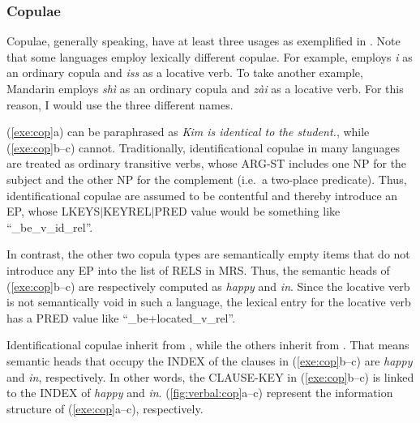 \subsubsection{Copulae}
\label{10:sssec:cop}

Copulae, generally speaking, have at least three usages as exemplified
in . Note that some languages employ
lexically different copulae. For example,  employs
\textit{i} as an ordinary copula and \textit{iss} as a locative
verb. To take another example, Mandarin  employs
\textit{sh\`{i}} as an ordinary copula and \textit{z\`{a}i} as a
locative verb. For this reason, I would use the three different names.



\noindent (\ref{exe:cop}a) can be paraphrased as \textit{Kim is
  identical to the student.}, while (\ref{exe:cop}b--c)
cannot. Traditionally, identificational copulae in many languages are
treated as ordinary transitive verbs, whose ARG-ST includes one NP for
the subject and the other NP for the complement (i.e.\ a two-place
predicate).  Thus, identificational copulae are assumed to be
contentful and thereby introduce an EP, whose
LKEYS{$\mid$}KEYREL{$\mid$}PRED value would be something like
``\_be\_v\_id\_rel''.


In contrast, the other two copula types are semantically empty items
that do not introduce any EP into the list of RELS in MRS.
Thus, the semantic heads of (\ref{exe:cop}b--c) are respectively
computed as \textit{happy} and \textit{in}. 
Since the locative verb is not semantically void in such a
language, the lexical entry for the locative verb has a PRED value
like ``\_be+located\_v\_rel''.



Identificational copulae inherit from ,
while the others inherit from . That means
semantic heads that occupy the INDEX of the clauses in
(\ref{exe:cop}b--c) are \textit{happy} and \textit{in},
respectively. In other words, the CLAUSE-KEY in
(\ref{exe:cop}b--c) is linked to the INDEX of \textit{happy} and
\textit{in}. (\ref{fig:verbal:cop}a--c) represent the information
structure of (\ref{exe:cop}a--c), respectively.

